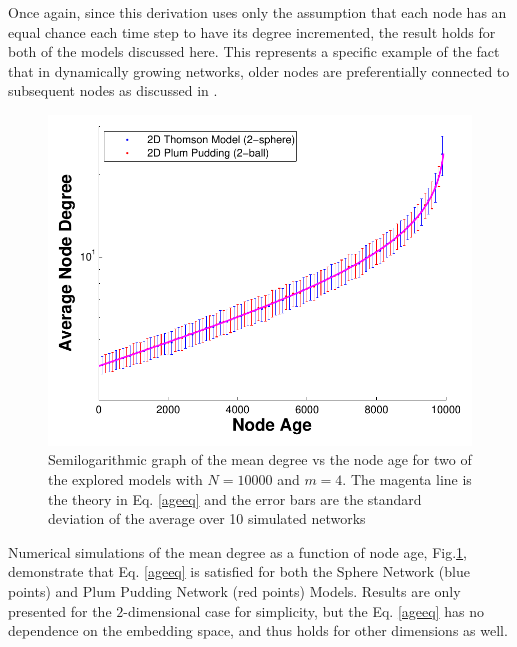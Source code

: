 \documentclass[aps,pre,manuscript,superscriptaddress,amsmath,amssymb,nofootinbib]{revtex4-1}
\begin{document}
Once again, since this derivation uses only the assumption that each node has an equal chance each time step to have its degree incremented, the result holds for both of the models discussed here.
This represents a specific example of the fact that in dynamically growing networks, older nodes are preferentially connected to subsequent nodes as discussed in \cite{reallyrandom}.
\begin{figure}
\includegraphics[width=\linewidth]{figures/figDvsAge.pdf}
\caption{\label{degage}Semilogarithmic graph of the mean degree vs the node age for two of the explored models with $N = 10000$ and $m = 4$. The magenta line is the theory in Eq. \eqref{ageeq} and the error bars are the standard deviation of the average over 10 simulated networks}
\end{figure}
Numerical simulations of the mean degree as a function of node age, Fig.\ref{degage}, demonstrate that Eq. \eqref{ageeq} is satisfied for both the Sphere Network (blue points) and Plum Pudding Network (red points) Models.
Results are only presented for the $2$-dimensional case for simplicity, but the Eq. \eqref{ageeq} has no dependence on the embedding space, and thus holds for other dimensions as well.
\end{document}
